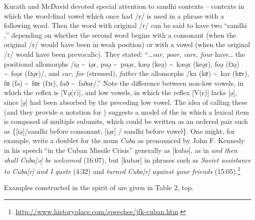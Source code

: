 \documentclass[output=paper,
modfonts
]{LSP/langsci}
\begin{document}
Kurath and McDavid devoted special attention to sandhi
contexts -- contexts in which the word-final vowel which once had /r/ is
used in a phrase with a following word. Then the word with original /r/
can be said to have two ``sandhi ,'' depending on whether the
second word begins with a consonant (when the original /r/ would have
been in weak position) or with a vowel (when the original /r/ would have
been prevocalic). They stated: ``\ldots{}\emph{ear, poor, care, four}
have\ldots{} the positional allomorphs /iə̯ \textasciitilde\ iə̯r, puə̯ \textasciitilde\ puə̯r, kæə̯ (keə̯) \textasciitilde\ kæə̯r (keə̯r), foə̯ (fɔə̯) 
\textasciitilde\ foə̯r (fɔə̯r)/, and \textit{car, for} (stressed), \textit{father} 
the allomorphs /ka (kɐ) \textasciitilde\ kar (kɐr), fɒ (fə) \textasciitilde\ fɒr (fɔr), fað \textasciitilde\ faðər/.'' Note
the difference between non-low vowels, in which the reflex is
{[}Və̯(r){]}, and low vowels, in which the reflex {[}V(r){]} lacks
{[}ə̯{]}, since {[}ə̯{]} had been absorbed by the preceding low vowel. The
idea of calling these  (and they provide a notation for
) suggests a model of the  in which a lexical item is
composed of multiple subunits, which could be written as an ordered pair
such as \{{[}iə̯{]}/sandhi before consonant; {[}iə̯r{]} / sandhi before
vowel\}. One might, for example, write a doublet for the noun
\emph{Cuba} as pronounced by John F. Kennedy in his speech ``in the
Cuban Missile Crisis'' generally as {[}kubə{]}, as in \emph{and then
shall Cuba{[}ə{]} be welcomed} (16:07), but {[}kubər{]} in phrases such
as \emph{Soviet assistance to Cuba{[}r{]} and I quote} (4:32) and
\emph{turned Cuba{[}r{]} against your friends} (15:05).\footnote{\url{http://www.historyplace.com/speeches/jfk-cuban.htm}.}

Examples constructed in the spirit of \citet{KUR} are given in
Table 2, top.
\end{document}
